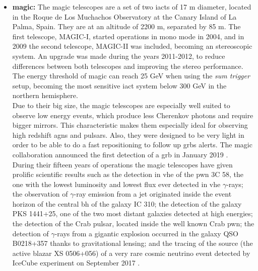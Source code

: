 \documentclass[main.tex]{subfiles}
\begin{document}
\begin{itemize}
    \item \textbf{\gls{magic}:} The \gls{magic} telescopes are a set of two \glspl{iact} of 17 m diameter, located in the Roque de Los Muchachos Observatory at the Canary Island of La Palma, Spain. They are at an altitude of 2200 m, separated by 85 m. The first telescope, MAGIC-I, started operations in mono mode in 2004, and in 2009 the second telescope, MAGIC-II was included, becoming an stereoscopic system. An upgrade was made during the years 2011-2012, to reduce differences between both telescopes and improving the stereo performance.\\
    The energy threshold of \gls{magic} can reach 25 GeV when using the \textit{sum trigger} setup, becoming the most sensitive \gls{iact} system below 300 GeV in the northern hemisphere.\\
    Due to their big size, the \gls{magic} telescopes are especially well suited to observe low energy events, which produce less Cherenkov photons and require bigger mirrors. This characteristic makes them especially ideal for observing high redshift \glspl{agn} and pulsars. Also, they were designed to be very light in order to be able to do a fast repositioning to follow up \glspl{grb} alerts. The \gls{magic} collaboration announced the first detection of a \gls{grb} in January 2019 \cite{2019MAGICGRB}.\\
    During their fifteen years of operations the \gls{magic} telescopes have given prolific scientific results such as the detection in \gls{vhe} of the \gls{pwn} 3C 58, the one with the lowest luminosity and lowest flux ever detected in \gls{vhe} $\gamma$-rays; the observation of $\gamma$-ray emission from a jet originated inside the event horizon of the central \gls{bh} of the galaxy IC 310; the detection of the galaxy PKS 1441+25, one of the two most distant galaxies detected at high energies; the detection of the Crab pulsar, located inside the well known Crab \gls{pwn}; the detection of $\gamma$-rays from a gigantic explosion occurred in the galaxy QSO B0218+357 thanks to gravitational lensing; and the tracing of the source (the active blazar XS 0506+056) of a very rare cosmic neutrino event detected by IceCube experiment on September 2017 \cite{MAGICweb}. \\
    

\end{itemize}
\end{document}
